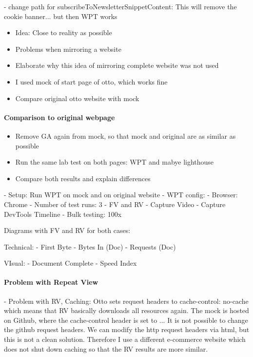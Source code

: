 - change path for subscribeToNewsletterSnippetContent: This will remove the cookie banner... but then WPT works



\begin{itemize}
    \item Idea: Close to reality as possible
    \item Problems when mirroring a website
    \item Elaborate why this idea of mirroring complete website was not used
    \item I used mock of start page of otto, which works fine
    \item Compare original otto website with mock
\end{itemize}





\paragraph{Comparison to original webpage}

\begin{itemize}
    \item Remove GA again from mock, so that mock and original are as similar as possible
    \item Run the same lab test on both pages: WPT and mabye lighthouse
    \item Compare both results and explain differences
\end{itemize}



- Setup: Run WPT on mock and on original website
- WPT config:
- Browser: Chrome
- Number of test runs: 3
- FV and RV
- Capture Video
- Capture DevTools Timeline
- Bulk testing: 100x



Diagrams with FV and RV for both cases:

Technical:
- First Byte
- Bytes In (Doc)
- Requests (Doc)

VIsual:
- Document Complete
- Speed Index

\paragraph{Problem with Repeat View}

- Problem with RV, Caching:
Otto sets request headers to cache-control: no-cache which means that RV basically downloads all resources again.
The mock is hosted on Github, where the cache-control header is set to ...
It is not possible to change the github request headers. We can modify the http request headers via html, but this is not a clean solution.
Therefore I use a different e-commerce website which does not shut down caching so that the RV results are more similar.

